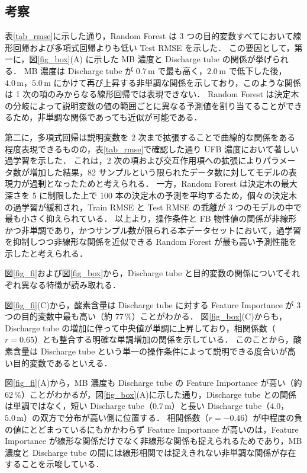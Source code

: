 \subsection{考察}
\label{sec_discussion}

表\ref{tab_rmse}に示した通り，Random Forest は 3 つの目的変数すべてにおいて線形回帰および多項式回帰よりも低い Test RMSE を示した．
この要因として，第一に，図\ref{fig_box}(A) に示した MB 濃度と Discharge tube の関係が挙げられる．
MB 濃度は Discharge tube が $ 0.7\,\mathrm{m} $ で最も高く，$ 2.0\,\mathrm{m} $ で低下した後，$ 4.0\,\mathrm{m} $，$ 5.0\,\mathrm{m} $ にかけて再び上昇する非単調な関係を示しており，このような関係は 1 次の項のみからなる線形回帰では表現できない．
Random Forest は決定木の分岐によって説明変数の値の範囲ごとに異なる予測値を割り当てることができるため，非単調な関係であっても近似が可能である．

第二に，多項式回帰は説明変数を 2 次まで拡張することで曲線的な関係をある程度表現できるものの，表\ref{tab_rmse}で確認した通り UFB 濃度において著しい過学習を示した．
これは，2 次の項および交互作用項への拡張によりパラメータ数が増加した結果，82 サンプルという限られたデータ数に対してモデルの表現力が過剰となったためと考えられる．
一方，Random Forest は決定木の最大深さを 5 に制限した上で 100 本の決定木の予測を平均するため，個々の決定木の過学習が緩和され，Train RMSE と Test RMSE の乖離が 3 つのモデルの中で最も小さく抑えられている．
以上より，操作条件と FB 物性値の関係が非線形かつ非単調であり，かつサンプル数が限られる本データセットにおいて，過学習を抑制しつつ非線形な関係を近似できる Random Forest が最も高い予測性能を示したと考えられる．

図\ref{fig_fi}および図\ref{fig_box}から，Discharge tube と目的変数の関係についてそれぞれ異なる特徴が読み取れる．

図\ref{fig_fi}(C)から，酸素含量は Discharge tube に対する Feature Importance が 3 つの目的変数中最も高い（約 $ 77\,\% $）ことがわかる．
図\ref{fig_box}(C)からも，Discharge tube の増加に伴って中央値が単調に上昇しており，相関係数（$ r = 0.65 $）とも整合する明確な単調増加の関係を示している．
このことから，酸素含量は Discharge tube という単一の操作条件によって説明できる度合いが高い目的変数であるといえる．

図\ref{fig_fi}(A)から，MB 濃度も Discharge tube の Feature Importance が高い（約 $ 62\,\% $）ことがわかるが，図\ref{fig_box}(A)に示した通り，Discharge tube との関係は単調ではなく，短い Discharge tube（$ 0.7\,\mathrm{m} $）と長い Discharge tube（$ 4.0$，$ 5.0\,\mathrm{m} $）の双方で分布が高い側に位置する．
相関係数（$ r = -0.46 $）が中程度の負の値にとどまっているにもかかわらず Feature Importance が高いのは，Feature Importance が線形な関係だけでなく非線形な関係も捉えられるためであり，MB 濃度と Discharge tube の間には線形相関では捉えきれない非単調な関係が存在することを示唆している．

